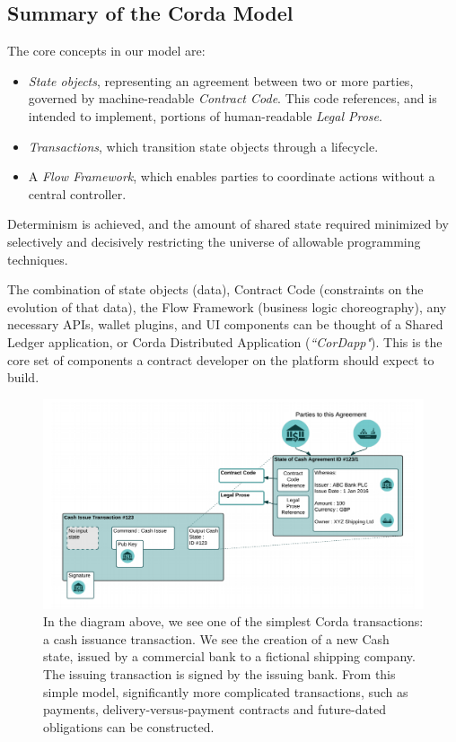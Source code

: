 \documentclass{article}
\begin{document}
\subsection{Summary of the Corda Model}
The core concepts in our model are:
\begin{itemize}

\item \textit{State objects}, representing an agreement between two or more parties, governed by machine-readable \textit{Contract Code}. This code references, and is intended to implement, portions of human-readable \textit{Legal Prose}. \item \textit{Transactions}, which transition state objects through a lifecycle.
\item A \textit{Flow Framework}, which enables parties to coordinate actions without a central controller.
\end{itemize}

Determinism is achieved, and the amount of shared state required minimized by selectively and decisively restricting the universe of allowable programming techniques.

The combination of state objects (data), Contract Code (constraints on the evolution of that data), the Flow Framework (business logic choreography), any necessary APIs, wallet plugins, and UI components can be thought of a Shared Ledger application, or Corda Distributed Application (\textit{``CorDapp"}). This is the core set of components a contract developer on the platform should expect to build.

\begin{figure}[H]
    \includegraphics[scale = .4, center]{cash}
    \caption{In the diagram above, we see one of the simplest Corda transactions: a cash issuance transaction.  We see the creation of a new Cash state, issued by a commercial bank to a fictional shipping company. The issuing transaction is signed by the issuing bank.  From this simple model, significantly more complicated transactions, such as payments, delivery-versus-payment contracts and future-dated obligations can be constructed.}
\end{figure}
\end{document}
